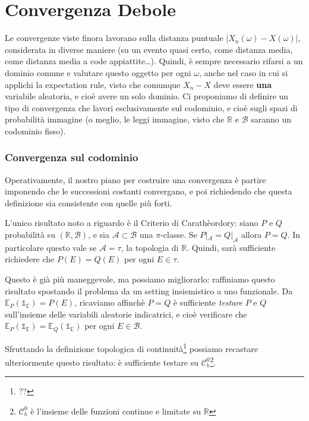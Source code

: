 
\renewcommand{\emph}[1]{\textbf{\textit{#1}}}

\chapter{Convergenza Debole}

	Le convergenze viste finora lavorano sulla distanza puntuale $\left| X_n(\omega) - X(\omega) \right|$, considerata in diverse maniere (su un evento quasi certo, come distanza media, come distanza media a code appiattite\dots). 
	Quindi, è sempre necessario rifarsi a un dominio comune e valutare questo oggetto per ogni $\omega$, anche nel caso in cui si applichi la expectation rule, visto che comunque $X_n - X$ deve essere \textbf{una} variabile aleatoria, e cioè avere un solo dominio.
	Ci proponiamo di definire un tipo di convergenza che lavori esclusivamente sul codominio, e cioè sugli spazi di probabilità immagine (o meglio, le leggi immagine, visto che $\mathbb{R}$ e $\mathcal{B}$ saranno un codominio fisso).

\subsection{Convergenza sul codominio}

Operativamente, il nostro piano per costruire una convergenza è partire imponendo che le successioni costanti convergano, e poi richiedendo che questa definizione sia consistente con quelle più forti.

\begin{my_remark}
	L'unico risultato noto a riguardo è il Criterio di Carathèordory: siano $P$ e $Q$ probabilità su $(\mathbb{R},\mathcal{B})$, e sia $\mathcal{A}\subset\mathcal{B}$ una $\pi$-classe. 
	Se $P|_\mathcal{A}=Q|_\mathcal{A}$ allora $P=Q$. 
	In particolare questo vale se $\mathcal{A}=\tau$, la topologia di $\mathbb{R}$.
	Quindi, sarà sufficiente richiedere che $P(E)=Q(E)$ per ogni $E\in\tau$.

	Questo è già più maneggevole, ma possiamo migliorarlo: raffiniamo questo risultato spostando il problema da un setting insiemistico a uno funzionale. Da $\mathbb{E}_P(\mathbb{1_E})=P(E)$, ricaviamo affinchè $P=Q$ è sufficiente \textit{testare} $P$ e $Q$ sull'insieme delle variabili aleatorie indicatrici, e cioè verificare che $\mathbb{E}_P(\mathbb{1_E})=\mathbb{E}_Q(\mathbb{1_E})$ per ogni $E\in\mathcal{B}$.

	Sfruttando la definizione topologica di continuità\footnote{??} possiamo recastare ulteriormente questo risultato: è sufficiente testare su $\mathcal{C}^0_b$\footnote{$\mathcal{C}^0_b$ è l'insieme delle funzioni continue e limitate su $\mathbb{R}$}.
\end{my_remark}

